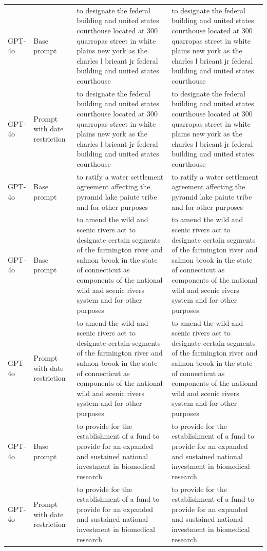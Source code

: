 \begin{longtable}{>{\raggedright\arraybackslash}p{1.4cm}>{\raggedright\arraybackslash}p{1.4cm}>{\raggedright\arraybackslash}p{5.5cm}>{\raggedright\arraybackslash}p{5.5cm}}
GPT-4o & Base prompt & to designate the federal building and united states courthouse located at 300 quarropas street in white plains new york as the charles l brieant jr federal building and united states courthouse & to designate the federal building and united states courthouse located at 300 quarropas street in white plains new york as the charles l brieant jr federal building and united states courthouse\\
GPT-4o & Prompt with date restriction & to designate the federal building and united states courthouse located at 300 quarropas street in white plains new york as the charles l brieant jr federal building and united states courthouse & to designate the federal building and united states courthouse located at 300 quarropas street in white plains new york as the charles l brieant jr federal building and united states courthouse\\
GPT-4o & Base prompt & to ratify a water settlement agreement affecting the pyramid lake paiute tribe and for other purposes & to ratify a water settlement agreement affecting the pyramid lake paiute tribe and for other purposes\\
GPT-4o & Base prompt & to amend the wild and scenic rivers act to designate certain segments of the farmington river and salmon brook in the state of connecticut as components of the national wild and scenic rivers system and for other purposes & to amend the wild and scenic rivers act to designate certain segments of the farmington river and salmon brook in the state of connecticut as components of the national wild and scenic rivers system and for other purposes\\
GPT-4o & Prompt with date restriction & to amend the wild and scenic rivers act to designate certain segments of the farmington river and salmon brook in the state of connecticut as components of the national wild and scenic rivers system and for other purposes & to amend the wild and scenic rivers act to designate certain segments of the farmington river and salmon brook in the state of connecticut as components of the national wild and scenic rivers system and for other purposes\\
GPT-4o & Base prompt & to provide for the establishment of a fund to provide for an expanded and sustained national investment in biomedical research & to provide for the establishment of a fund to provide for an expanded and sustained national investment in biomedical research\\
GPT-4o & Prompt with date restriction & to provide for the establishment of a fund to provide for an expanded and sustained national investment in biomedical research & to provide for the establishment of a fund to provide for an expanded and sustained national investment in biomedical research\\

\end{longtable}
